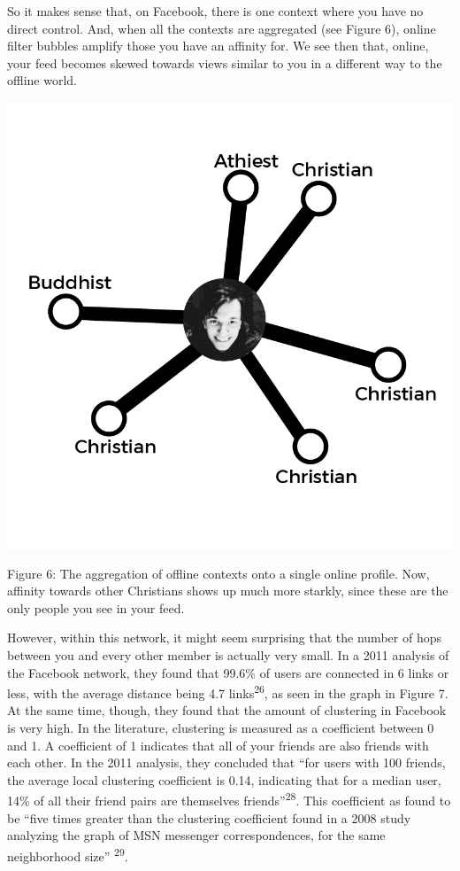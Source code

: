 \documentclass[]{article}
\begin{document}
So it makes sense that, on Facebook, there is one context where you have
no direct control. And, when all the contexts are aggregated (see Figure
6), online filter bubbles amplify those you have an affinity for. We see
then that, online, your feed becomes skewed towards views similar to you
in a different way to the offline world.

\includegraphics{./NetworkDiagram1_2.png}

Figure 6: The aggregation of offline contexts onto a single online
profile. Now, affinity towards other Christians shows up much more
starkly, since these are the only people you see in your feed.

However, within this network, it might seem surprising that the number
of hops between you and every other member is actually very small. In a
2011 analysis of the Facebook network, they found that 99.6\% of users
are connected in 6 links or less, with the average distance being 4.7
links\textsuperscript{26}, as seen in the graph in Figure 7. At the same
time, though, they found that the amount of clustering in Facebook is
very high. In the literature, clustering is measured as a coefficient
between 0 and 1. A coefficient of 1 indicates that all of your friends
are also friends with each other. In the 2011 analysis, they concluded
that ``for users with 100 friends, the average local clustering
coefficient is 0.14, indicating that for a median user, 14\% of all
their friend pairs are themselves friends''\textsuperscript{28}. This
coefficient as found to be ``five times greater than the clustering
coefficient found in a 2008 study analyzing the graph of MSN messenger
correspondences, for the same neighborhood size'' \textsuperscript{29}.
\end{document}
